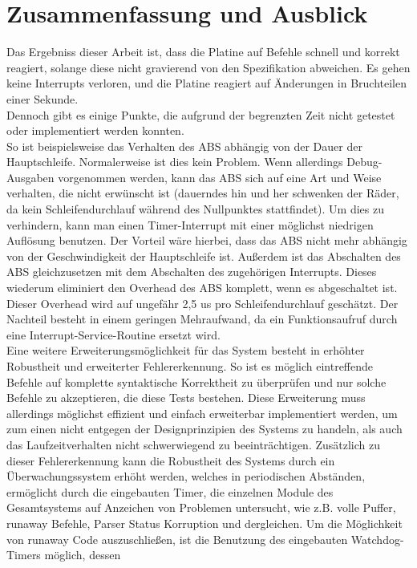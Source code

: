 \chapter{Zusammenfassung und Ausblick}
Das Ergebniss dieser Arbeit ist, dass die Platine auf Befehle schnell und korrekt reagiert,
solange diese nicht gravierend von den Spezifikation abweichen. Es gehen keine Interrupts verloren, und die
Platine reagiert auf Änderungen in Bruchteilen einer Sekunde.\\
Dennoch gibt es einige Punkte, die aufgrund der begrenzten Zeit nicht getestet oder implementiert
werden konnten.\\
So ist beispielsweise das Verhalten des ABS abhängig von der Dauer der Hauptschleife. Normalerweise
ist dies kein Problem. Wenn allerdings Debug-Ausgaben vorgenommen werden, kann das ABS sich
auf eine Art und Weise verhalten, die nicht erwünscht ist (dauerndes hin und her schwenken der Räder,
da kein Schleifendurchlauf während des Nullpunktes stattfindet). Um dies zu verhindern, kann man
einen Timer-Interrupt mit einer möglichst niedrigen Auflösung benutzen. Der Vorteil wäre hierbei,
dass das ABS nicht mehr abhängig von der Geschwindigkeit der Hauptschleife ist. Außerdem ist das
Abschalten des ABS gleichzusetzen mit dem Abschalten des zugehörigen Interrupts. Dieses wiederum
eliminiert den Overhead des ABS komplett, wenn es abgeschaltet ist. Dieser Overhead wird auf
ungefähr 2,5 us pro Schleifendurchlauf geschätzt. Der Nachteil besteht in einem geringen
Mehraufwand, da ein Funktionsaufruf durch eine Interrupt-Service-Routine ersetzt wird.\\
Eine weitere Erweiterungsmöglichkeit für das System besteht in erhöhter Robustheit und erweiterter
Fehlererkennung. So ist es möglich eintreffende Befehle auf komplette syntaktische Korrektheit
zu überprüfen und nur solche Befehle zu akzeptieren, die diese Tests bestehen. Diese Erweiterung
muss allerdings möglichst effizient und einfach erweiterbar implementiert werden, um zum einen nicht
entgegen der Designprinzipien des Systems zu handeln, als auch das Laufzeitverhalten nicht
schwerwiegend zu beeinträchtigen. Zusätzlich zu dieser Fehlererkennung kann die Robustheit des Systems
durch ein Überwachungssystem erhöht werden, welches in periodischen Abständen, ermöglicht durch
die eingebauten Timer, die einzelnen Module des Gesamtsystems auf Anzeichen von Problemen untersucht,
wie z.B. volle Puffer, runaway Befehle, Parser Status Korruption und dergleichen. Um die Möglichkeit
von runaway Code auszuschließen, ist die Benutzung des eingebauten Watchdog-Timers möglich, dessen

